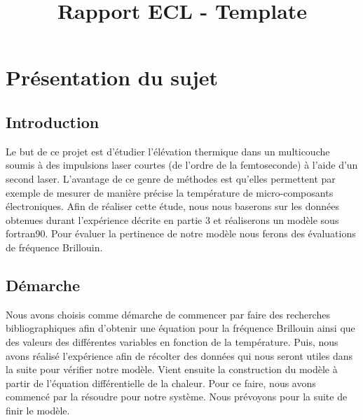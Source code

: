 \documentclass{rapportECC}
\title{Rapport ECL - Template} %
\begin{document}





        
\fairemarges %
\fairepagedegarde %
\tabledematieres %



\section{Présentation du sujet} 

\subsection{Introduction}

Le but de ce projet est d'étudier l'élévation thermique dans un multicouche soumis à des impulsions laser courtes (de l'ordre de la femtoseconde) à l'aide d'un second laser. L'avantage de ce genre de méthodes est qu'elles permettent par exemple de mesurer de manière précise la température de micro-composants électroniques. 
Afin de réaliser cette étude, nous nous baserons sur les données obtenues durant l'expérience décrite en partie 3 et réaliserons un modèle sous fortran90. Pour évaluer la pertinence de notre modèle nous ferons des évaluations de fréquence Brillouin.

\subsection{Démarche}

Nous avons choisis comme démarche de commencer par faire des recherches bibliographiques afin d'obtenir une équation pour la fréquence Brillouin ainsi que des valeurs des différentes variables en fonction de la température. Puis, nous avons réalisé l'expérience afin de récolter des données qui nous seront utiles dans la suite pour vérifier notre modèle. Vient ensuite la construction du modèle à partir de l'équation différentielle de la chaleur. Pour ce faire, nous avons commencé par la résoudre pour notre système. Nous prévoyons pour la suite de finir le modèle.
\end{document}
